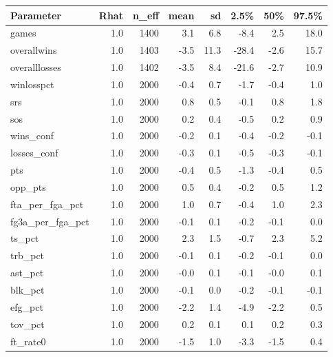 \documentclass[10pt,a4paper, hidelinks]{article} %
\begin{document}
\begin{table}[ht]
	\centering
	\begin{tabular}{lrrrrrrr}
		\toprule
		Parameter & Rhat & n\_eff & mean & sd & 2.5\% & 50\% & 97.5\% \\ 
		\midrule
		games & 1.0 & 1400 & 3.1 & 6.8 & -8.4 & 2.5 & 18.0 \\ 
		overallwins & 1.0 & 1403 & -3.5 & 11.3 & -28.4 & -2.6 & 15.7 \\ 
		overalllosses & 1.0 & 1402 & -3.5 & 8.4 & -21.6 & -2.7 & 10.9 \\ 
		winlosspct & 1.0 & 2000 & -0.4 & 0.7 & -1.7 & -0.4 & 1.0 \\ 
		srs & 1.0 & 2000 & 0.8 & 0.5 & -0.1 & 0.8 & 1.8 \\ 
		sos & 1.0 & 2000 & 0.2 & 0.4 & -0.5 & 0.2 & 0.9 \\ 
		wins\_conf & 1.0 & 2000 & -0.2 & 0.1 & -0.4 & -0.2 & -0.1 \\ 
		losses\_conf & 1.0 & 2000 & -0.3 & 0.1 & -0.5 & -0.3 & -0.1 \\ 
		pts & 1.0 & 2000 & -0.4 & 0.5 & -1.3 & -0.4 & 0.5 \\ 
		opp\_pts & 1.0 & 2000 & 0.5 & 0.4 & -0.2 & 0.5 & 1.2 \\ 
		fta\_per\_fga\_pct & 1.0 & 2000 & 1.0 & 0.7 & -0.4 & 1.0 & 2.3 \\ 
		fg3a\_per\_fga\_pct & 1.0 & 2000 & -0.1 & 0.1 & -0.2 & -0.1 & 0.0 \\ 
		ts\_pct & 1.0 & 2000 & 2.3 & 1.5 & -0.7 & 2.3 & 5.2 \\ 
		trb\_pct & 1.0 & 2000 & -0.1 & 0.1 & -0.2 & -0.1 & 0.0 \\ 
		ast\_pct & 1.0 & 2000 & -0.0 & 0.1 & -0.1 & -0.0 & 0.1 \\ 
		blk\_pct & 1.0 & 2000 & -0.1 & 0.0 & -0.2 & -0.1 & -0.1 \\ 
		efg\_pct & 1.0 & 2000 & -2.2 & 1.4 & -4.9 & -2.2 & 0.5 \\ 
		tov\_pct & 1.0 & 2000 & 0.2 & 0.1 & 0.1 & 0.2 & 0.3 \\ 
		ft\_rate0 & 1.0 & 2000 & -1.5 & 1.0 & -3.3 & -1.5 & 0.4 \\ 

\end{tabular}
\end{table}
\end{document}
